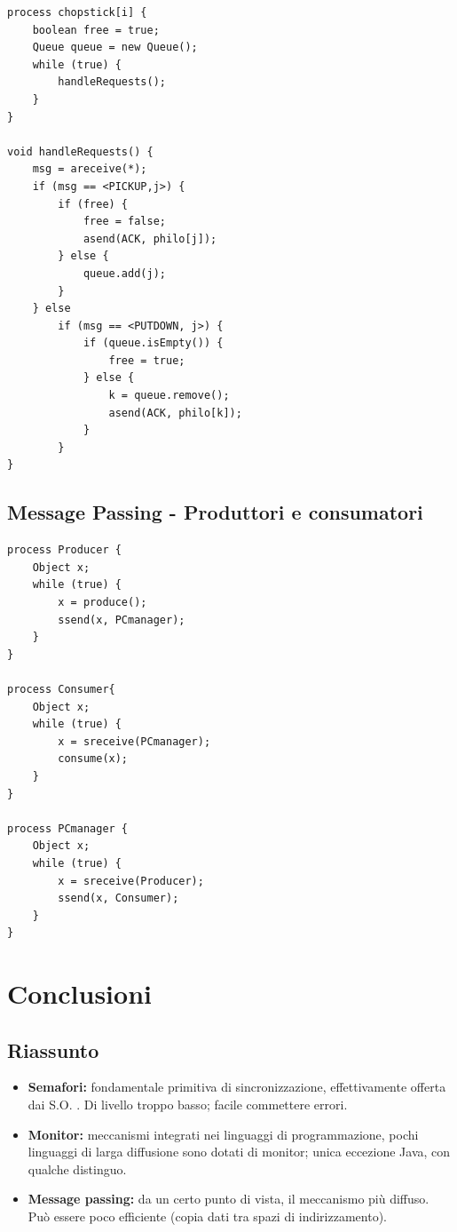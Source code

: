 \begin{lstlisting}
process chopstick[i] {
    boolean free = true;
    Queue queue = new Queue();
    while (true) {
        handleRequests();
    }
}

void handleRequests() {
    msg = areceive(*);
    if (msg == <PICKUP,j>) {
        if (free) {
            free = false;
            asend(ACK, philo[j]);
        } else {
            queue.add(j);
        }
    } else
        if (msg == <PUTDOWN, j>) {
            if (queue.isEmpty()) {
                free = true;
            } else {
                k = queue.remove();
                asend(ACK, philo[k]);
            }
        }
}
\end{lstlisting}
\newpage
\subsection{Message Passing - Produttori e consumatori}
\begin{lstlisting}
process Producer {
    Object x;
    while (true) {
        x = produce();
        ssend(x, PCmanager);
    }
}

process Consumer{
    Object x;
    while (true) {
        x = sreceive(PCmanager);
        consume(x);
    }
}

process PCmanager {
    Object x;
    while (true) {
        x = sreceive(Producer);
        ssend(x, Consumer);
    }
}
\end{lstlisting}

\section{Conclusioni} 
\subsection{Riassunto}
\begin{itemize}
    \item \textbf{Semafori:} fondamentale primitiva di sincronizzazione, effettivamente offerta dai S.O. . Di livello troppo basso; facile commettere errori.
    \item  \textbf{Monitor:} meccanismi integrati nei linguaggi di programmazione, pochi linguaggi di larga diffusione sono dotati di monitor; unica eccezione Java, con qualche distinguo.
    \item \textbf{Message passing:} da un certo punto di vista, il meccanismo più diffuso. Può essere poco efficiente (copia dati tra spazi di indirizzamento).
\end{itemize}
